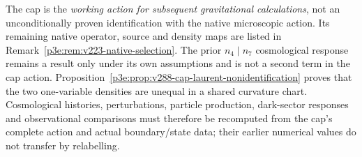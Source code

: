 \documentclass[12pt,a4paper]{article}
\begin{document}
\begin{remark}
\label{p8:rem:v223-cap-status}
The cap is the \emph{working action for subsequent gravitational
calculations}, not an unconditionally proven identification with the
native microscopic action. Its remaining native operator, source and
density maps are listed in Remark~\ref{p3e:rem:v223-native-selection}.
The prior $n_4\mid n_7$ cosmological response remains a result only
under its own assumptions and is not a second term in the cap action.
Proposition~\ref{p3e:prop:v288-cap-laurent-nonidentification} proves that
the two one-variable densities are unequal in a shared curvature chart.
Cosmological histories, perturbations, particle production,
dark-sector responses and observational comparisons must therefore be
recomputed from the cap's complete action and actual boundary/state
data; their earlier numerical values do not transfer by relabelling.
\end{remark}
\end{document}
